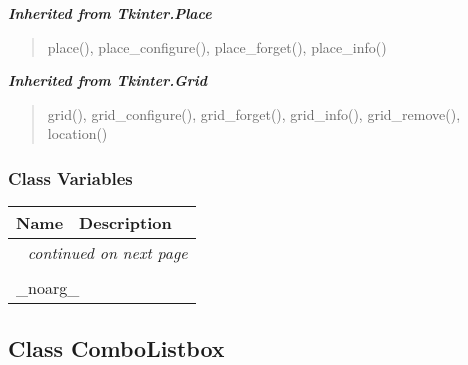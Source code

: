 \large{\textbf{\textit{Inherited from Tkinter.Place}}}

\begin{quote}
place(), place\_configure(), place\_forget(), place\_info()
\end{quote}

\large{\textbf{\textit{Inherited from Tkinter.Grid}}}

\begin{quote}
grid(), grid\_configure(), grid\_forget(), grid\_info(), grid\_remove(), location()
\end{quote}


  \subsubsection{Class Variables}

    \vspace{-1cm}
\hspace{\varindent}\begin{longtable}{|p{\varnamewidth}|p{\vardescrwidth}|l}
\cline{1-2}
\cline{1-2} \centering \textbf{Name} & \centering \textbf{Description}& \\
\cline{1-2}
\endhead\cline{1-2}\multicolumn{3}{r}{\small\textit{continued on next page}}\\\endfoot\cline{1-2}
\endlastfoot\multicolumn{2}{|l|}{\textit{Inherited from Tkinter.Misc}}\\
\multicolumn{2}{|p{\varwidth}|}{\raggedright \_noarg\_}\\
\cline{1-2}
\end{longtable}



\subsection{Class ComboListbox}

